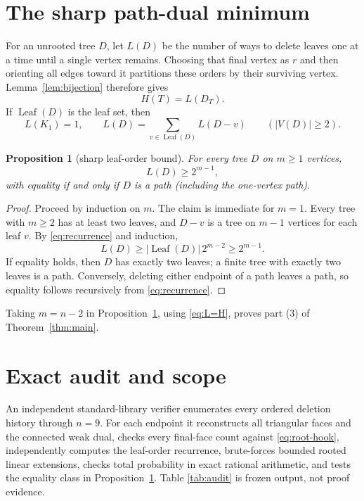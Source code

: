 \documentclass[a4paper,10pt]{amsart}
\newtheorem{proposition}[theorem]{Proposition}
\theoremstyle{remark}
\begin{document}
\section{The sharp path-dual minimum}

For an unrooted tree $D$, let $L(D)$ be the number of ways to delete leaves
one at a time until a single vertex remains.  Choosing that final vertex as
$r$ and then orienting all edges toward it partitions these orders by their
surviving vertex.  Lemma~\ref{lem:bijection} therefore gives
\begin{equation}\label{eq:L=H}
       H(T)=L(D_T).
\end{equation}
If $\mathop{Leaf}(D)$ is the leaf set, then
\begin{equation}\label{eq:recurrence}
 L(K_1)=1,
 \qquad
 L(D)=\sum_{v\in\mathop{Leaf}(D)}L(D-v)\qquad (|V(D)|\ge2).
\end{equation}

\begin{proposition}[sharp leaf-order bound]\label{prop:min}
For every tree $D$ on $m\ge1$ vertices,
\[
       L(D)\ge2^{m-1},
\]
with equality if and only if $D$ is a path (including the one-vertex path).
\end{proposition}

\begin{proof}
Proceed by induction on $m$.  The claim is immediate for $m=1$.  Every tree
with $m\ge2$ has at least two leaves, and $D-v$ is a tree on $m-1$ vertices
for each leaf $v$.  By \eqref{eq:recurrence} and induction,
\[
 L(D)\ge |\mathop{Leaf}(D)|\,2^{m-2}\ge2^{m-1}.
\]
If equality holds, then $D$ has exactly two leaves; a finite tree with exactly
two leaves is a path.  Conversely, deleting either endpoint of a path leaves
a path, so equality follows recursively from \eqref{eq:recurrence}.
\end{proof}

Taking $m=n-2$ in Proposition~\ref{prop:min}, using
\eqref{eq:L=H}, proves part (3) of Theorem~\ref{thm:main}.

\section{Exact audit and scope}

An independent standard-library verifier enumerates every ordered deletion
history through $n=9$.  For each endpoint it reconstructs all triangular
faces and the connected weak dual, checks every final-face count against
\eqref{eq:root-hook}, independently computes the leaf-order recurrence,
brute-forces bounded rooted linear extensions, checks total probability in
exact rational arithmetic, and tests the equality class in
Proposition~\ref{prop:min}.  Table
\ref{tab:audit} is frozen output, not proof evidence.
\end{document}
